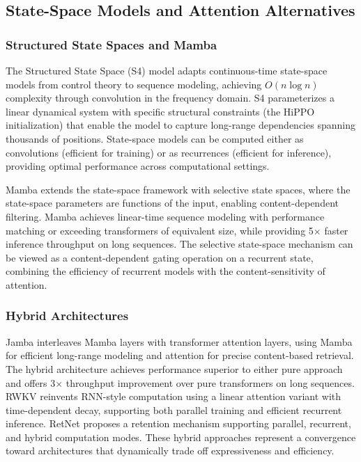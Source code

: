 \documentclass[11pt,letterpaper]{article}
\begin{document}
\subsection{State-Space Models and Attention Alternatives}

\subsubsection{Structured State Spaces and Mamba}

The Structured State Space (S4) model \cite{gu2022efficiently} adapts continuous-time state-space models from control theory to sequence modeling, achieving $O(n \log n)$ complexity through convolution in the frequency domain. S4 parameterizes a linear dynamical system with specific structural constraints (the HiPPO initialization) that enable the model to capture long-range dependencies spanning thousands of positions. State-space models can be computed either as convolutions (efficient for training) or as recurrences (efficient for inference), providing optimal performance across computational settings.

Mamba \cite{gu2023mamba} extends the state-space framework with selective state spaces, where the state-space parameters are functions of the input, enabling content-dependent filtering. Mamba achieves linear-time sequence modeling with performance matching or exceeding transformers of equivalent size, while providing 5$\times$ faster inference throughput on long sequences. The selective state-space mechanism can be viewed as a content-dependent gating operation on a recurrent state, combining the efficiency of recurrent models with the content-sensitivity of attention.

\subsubsection{Hybrid Architectures}

Jamba \cite{lieber2024jamba} interleaves Mamba layers with transformer attention layers, using Mamba for efficient long-range modeling and attention for precise content-based retrieval. The hybrid architecture achieves performance superior to either pure approach and offers 3$\times$ throughput improvement over pure transformers on long sequences. RWKV \cite{peng2023rwkv} reinvents RNN-style computation using a linear attention variant with time-dependent decay, supporting both parallel training and efficient recurrent inference. RetNet \cite{sun2023retentive} proposes a retention mechanism supporting parallel, recurrent, and hybrid computation modes. These hybrid approaches represent a convergence toward architectures that dynamically trade off expressiveness and efficiency.
\end{document}
